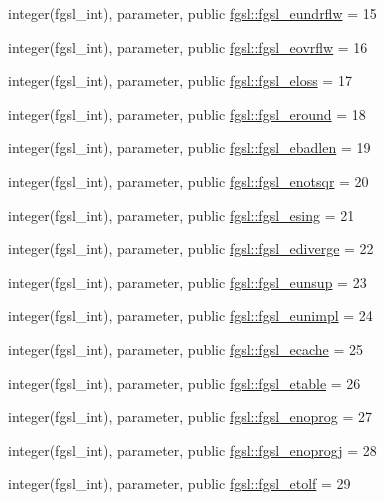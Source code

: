 \begin{DoxyCompactItemize}
\item 
integer(fgsl\+\_\+int), parameter, public \hyperlink{namespacefgsl_ae5ac5a32777e537541e47cb0419da46c}{fgsl\+::fgsl\+\_\+eundrflw} = 15
\item 
integer(fgsl\+\_\+int), parameter, public \hyperlink{namespacefgsl_a7dc79e0a3af443223d2320c5e2b7b803}{fgsl\+::fgsl\+\_\+eovrflw} = 16
\item 
integer(fgsl\+\_\+int), parameter, public \hyperlink{namespacefgsl_afdf53f6a99fb8880de40cd8136bf8e1c}{fgsl\+::fgsl\+\_\+eloss} = 17
\item 
integer(fgsl\+\_\+int), parameter, public \hyperlink{namespacefgsl_a46f7428fe03a54ce95e47c21d299a129}{fgsl\+::fgsl\+\_\+eround} = 18
\item 
integer(fgsl\+\_\+int), parameter, public \hyperlink{namespacefgsl_ac1f16c63f7a3d224fceb2113566856f5}{fgsl\+::fgsl\+\_\+ebadlen} = 19
\item 
integer(fgsl\+\_\+int), parameter, public \hyperlink{namespacefgsl_a0ad3f5a5023fcd60f764cab3b2b07984}{fgsl\+::fgsl\+\_\+enotsqr} = 20
\item 
integer(fgsl\+\_\+int), parameter, public \hyperlink{namespacefgsl_aeb4c28b199599ec4c17ff7330a4ad10d}{fgsl\+::fgsl\+\_\+esing} = 21
\item 
integer(fgsl\+\_\+int), parameter, public \hyperlink{namespacefgsl_a955eb5c7585781ffb9e336843a471566}{fgsl\+::fgsl\+\_\+ediverge} = 22
\item 
integer(fgsl\+\_\+int), parameter, public \hyperlink{namespacefgsl_af76528fed48ac5623d664d6e66e7ac1b}{fgsl\+::fgsl\+\_\+eunsup} = 23
\item 
integer(fgsl\+\_\+int), parameter, public \hyperlink{namespacefgsl_a3a2e9a31e7f3fc209b5269b82d17117c}{fgsl\+::fgsl\+\_\+eunimpl} = 24
\item 
integer(fgsl\+\_\+int), parameter, public \hyperlink{namespacefgsl_aa9ace1ec026e9acd65806d63c8b6e649}{fgsl\+::fgsl\+\_\+ecache} = 25
\item 
integer(fgsl\+\_\+int), parameter, public \hyperlink{namespacefgsl_ac1348341f3d95b02f852466ca383d1ae}{fgsl\+::fgsl\+\_\+etable} = 26
\item 
integer(fgsl\+\_\+int), parameter, public \hyperlink{namespacefgsl_a11266b4068f90334758a26d35c116f73}{fgsl\+::fgsl\+\_\+enoprog} = 27
\item 
integer(fgsl\+\_\+int), parameter, public \hyperlink{namespacefgsl_ad9567598ce07cacf43815d0453e649bb}{fgsl\+::fgsl\+\_\+enoprogj} = 28
\item 
integer(fgsl\+\_\+int), parameter, public \hyperlink{namespacefgsl_a9b3ff0443a3c8e9570d06e762b1ca241}{fgsl\+::fgsl\+\_\+etolf} = 29

\end{DoxyCompactItemize}
